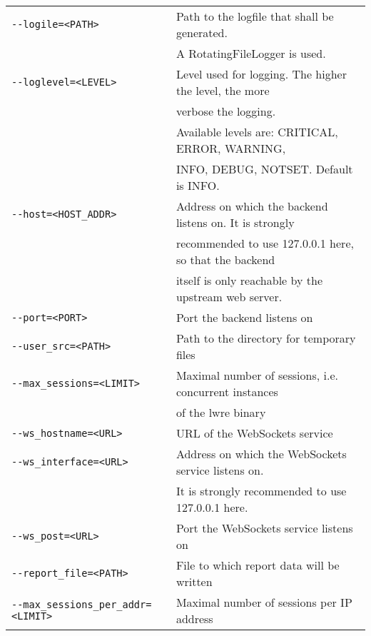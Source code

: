 \begin{tabular}{@{}l l}
\verb|--logile=<PATH>|                          & Path to the logfile that shall be generated.\\
                                                             & A RotatingFileLogger is used.\\
\verb|--loglevel=<LEVEL>|                       & Level used for logging. The higher the level, the more\\
                                                             & verbose the logging.\\
                                                             & Available levels are: CRITICAL, ERROR, WARNING,\\
                                                             & INFO, DEBUG, NOTSET. Default is INFO.\\
\verb|--host=<HOST_ADDR>|        & Address on which the backend listens on. It is strongly\\
                                                             & recommended to use 127.0.0.1 here, so that the backend\\
                                                             &  itself is only reachable by the upstream web server.\\
\verb|--port=<PORT>|                           & Port the backend listens on\\
\verb|--user_src=<PATH>|         & Path to the directory for temporary files\\
\verb|--max_sessions=<LIMIT>|  & Maximal number of sessions, i.e. concurrent instances\\
                                                             & of the lwre binary\\
\verb|--ws_hostname=<URL>|       & URL of the WebSockets service\\
\verb|--ws_interface=<URL>|      & Address on which the WebSockets service listens on.\\
                                                             & It is strongly recommended to use 127.0.0.1 here.\\
\verb|--ws_post=<URL>|           & Port the WebSockets service listens on\\
\verb|--report_file=<PATH>|           & File to which report data will be written\\
\verb|--max_sessions_per_addr=<LIMIT>|           & Maximal number of sessions per IP address\\
\end{tabular}

